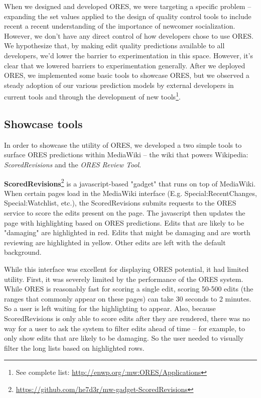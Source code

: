 When we designed and developed ORES, we were targeting a specific problem -- expanding the set values applied to the design of quality control tools to include recent a recent understanding of the importance of newcomer socialization.  However, we don't have any direct control of how developers chose to use ORES.  We hypothesize that, by making edit quality predictions available to all developers, we'd lower the barrier to experimentation in this space.  However, it's clear that we lowered barriers to experimentation generally.  After we deployed ORES, we implemented some basic tools to showcase ORES, but we observed a steady adoption of our various prediction models by external developers in current tools and through the development of new tools\footnote{See complete list: \url{http://enwp.org/:mw:ORES/Applications}}.

\subsection{Showcase tools}
In order to showcase the utility of ORES, we developed a two simple tools to surface ORES predictions within MediaWiki -- the wiki that powers Wikipedia: \emph{ScoredRevisions} and the \emph{ORES Review Tool}.

\textbf{ScoredRevisions}\footnote{\url{https://github.com/he7d3r/mw-gadget-ScoredRevisions}} is a javascript-based "gadget" that runs on top of MediaWiki.  When certain pages load in the MediaWiki interface (E.g. Special:RecentChanges, Special:Watchlist, etc.), the ScoredRevisions submits requests to the ORES service to score the edits present on the page.  The javascript then updates the page with highlighting based on ORES predictions.  Edits that are likely to be "damaging" are highlighted in red.  Edits that might be damaging and are worth reviewing are highlighted in yellow.  Other edits are left with the default background.

While this interface was excellent for displaying ORES potential, it had limited utility.  First, it was severely limited by the performance of the ORES system.  While ORES is reasonably fast for scoring a single edit, scoring 50-500 edits (the ranges that commonly appear on these pages) can take 30 seconds to 2 minutes.  So a user is left waiting for the highlighting to appear.  Also, because ScoredRevisions is only able to score edits after they are rendered, there was no way for a user to ask the system to filter edits ahead of time -- for example, to only show edits that are likely to be damaging.  So the user needed to visually filter the long lists based on highlighted rows.

